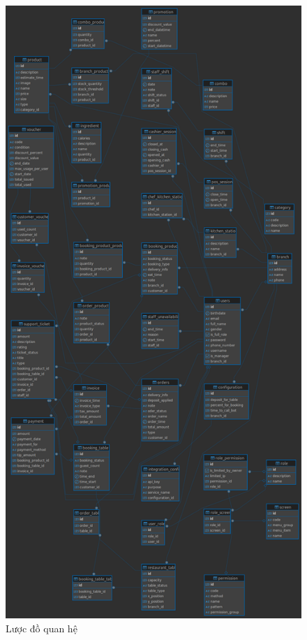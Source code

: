 \begin{figure}[H]
    \centering
    \includegraphics[height=0.9\textheight]{Images/ldqh.png}
    \vspace{0.5cm}
    \caption{Lược đồ quan hệ}
    \label{fig:my_label}
\end{figure}
